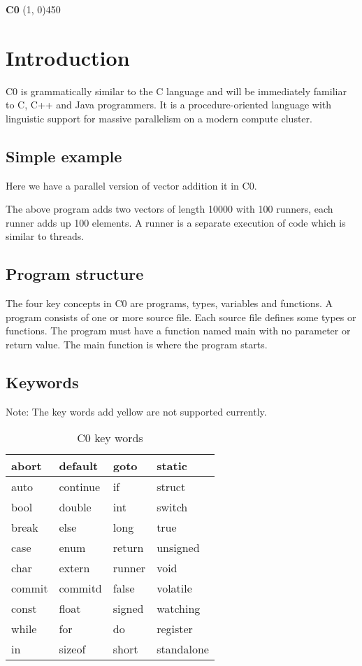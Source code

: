\documentclass[a4paper]{article}
\begin{document}
\begin{flushleft}
\Large \textbf{C0}
\line(1, 0){450}
\end{flushleft}

\section{Introduction}
C0 is grammatically similar to the C language and will be immediately familiar to C, C++ and Java programmers. It is a procedure-oriented language with linguistic support for massive parallelism on a modern compute cluster. 

\subsection{Simple example}
Here we have a parallel version of vector addition it in C0.

The above program adds two vectors of length 10000 with 100 runners, each runner adds up 100 elements. A runner is a separate execution of code which is similar to threads.

\subsection{Program structure}
The four key concepts in C0 are programs, types, variables and functions. A program consists of one or more source file. Each source file defines some types or functions. The program must have a function named main with no parameter or return value. The main function is where the program starts.

\subsection{Keywords}
Note: The key words add yellow are not supported currently.

\begin{table}[htbp]
\centering
\caption{C0 key words}
\begin{tabular}{|l|l|l|l|}
\hline
abort & default & goto & static\\
\hline
auto & continue & if & struct\\
\hline
bool & double & int & switch\\
\hline
break & else & long & true\\
\hline
case & enum & return & unsigned\\
\hline
char & extern & runner & void\\
\hline
commit & commitd & false & volatile\\
\hline
const & float & signed & watching\\
\hline
while & for & do & register\\
\hline
in & sizeof & short & standalone\\
\hline
\end{tabular}
\label{table:key-words}
\end{table}
\end{document}
